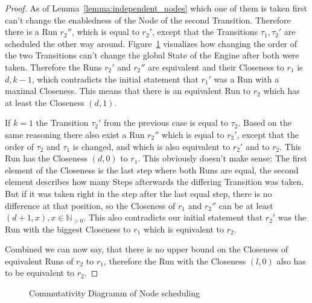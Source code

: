 \begin{proof}
As of Lemma~\ref{lemma:independent_nodes} which one of them is taken first can't change the enabledness of the Node of the second Transition.
Therefore there is a Run \(r_2''\), which is equal to \(r_2'\), except that the Transitions \(\tau_1, \tau_2'\) are scheduled the other way around.
Figure~\ref{fig:chap3:sec_sync:commutativity_scheduling} visualizes how changing the order of the two Transitions can't change the global State of the Engine after both were taken.
Therefore the Runs \(r_2'\) and \(r_2''\) are equivalent and their Closeness to \(r_1\) is \(d, k-1\), which contradicts the initial statement that \(r_1'\) was a Run with a maximal Closeness.
This means that there is an equivalent Run to \(r_2\) which has at least the Closeness \((d, 1)\).

If \(k = 1\) the Transition \(\tau_2'\) from the previous case is equal to \(\tau_2\).
Based on the same reasoning there also exist a Run \(r_2''\) which is equal to \(r_2'\), except that the order of \(\tau_2\) and \(\tau_1\) is changed, and which is also equivalent to \(r_2'\) and to \(r_2\).
This Run has the Closeness \((d, 0)\) to \(r_1\).
This obviously doesn't make sense: The first element of the Closeness is the last step where both Runs are equal, the second element describes how many Steps afterwards the differing Transition was taken.
But if it was taken right in the step after the last equal step, there is no difference at that position, so the Closeness of \(r_1\) and \(r_2''\) can be at least \((d+1, x), x \in \mathbb{N}_{>0}\).
This also contradicts our initial statement that \(r_2'\) was the Run with the biggest Closeness to \(r_1\) which is equivalent to \(r_2\).

Combined we can now say, that there is no upper bound on the Closeness of equivalent Runs of \(r_2\) to \(r_1\), therefore the Run with the Closeness \((l, 0)\) also has to be equivalent to \(r_2\).

\end{proof}


\begin{figure}
  \caption{Commutativity Diagramm of Node scheduling}
\label{fig:chap3:sec_sync:commutativity_scheduling}
\end{figure}



